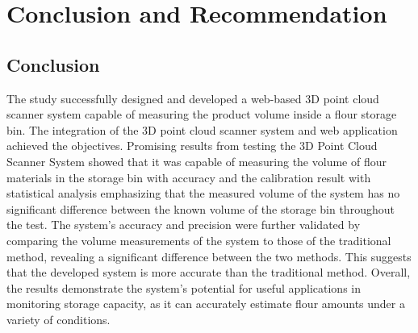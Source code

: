 \renewcommand{\thechapter}{\Roman{chapter}}
\chapter{Conclusion and Recommendation}
\renewcommand{\thechapter}{\arabic{chapter}}
\label{ch:Result and Discussion}
\thispagestyle{empty}

\section{Conclusion}
\label{ch5:sec:conlusion}


The study successfully designed and developed a web-based 3D point cloud scanner system capable of measuring the product volume inside a flour storage bin. The integration of the 3D point cloud scanner system and web application achieved the objectives. Promising results from testing the 3D Point Cloud Scanner System showed that it was capable of measuring the volume of flour materials in the storage bin with accuracy and the calibration result with statistical analysis emphasizing that the measured volume of the system has no significant difference between the known volume of the storage bin throughout the test. The system's accuracy and precision were further validated by comparing the volume measurements of the system to those of the traditional method, revealing a significant difference between the two methods. This suggests that the developed system is more accurate than the traditional method. Overall, the results demonstrate the system's potential for useful applications in monitoring storage capacity, as it can accurately estimate flour amounts under a variety of conditions.


